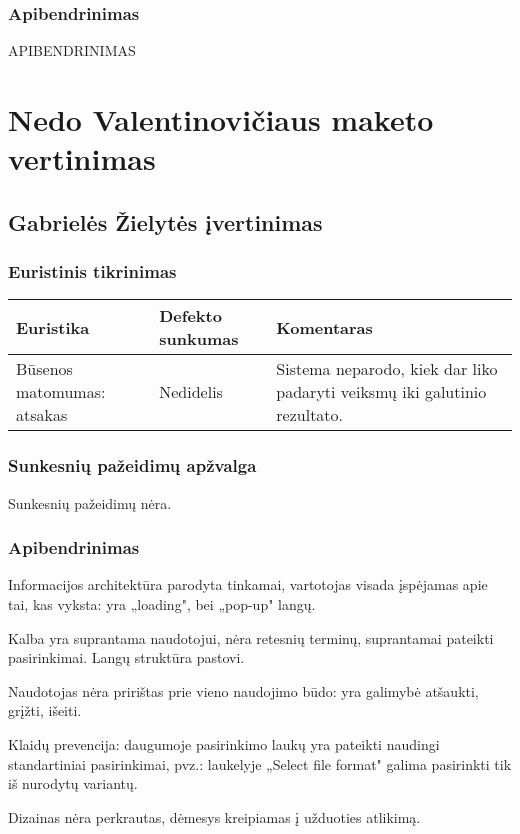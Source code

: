 \documentclass{VUMIFPSkursinis}
\begin{document}
\subsubsection{Apibendrinimas}
APIBENDRINIMAS

\section{Nedo Valentinovičiaus maketo vertinimas}
\subsection{Gabrielės Žielytės įvertinimas}
\subsubsection{Euristinis tikrinimas}
\begin{center}
 \begin{tabular}{|| p{4cm} | p{4cm} | p{8cm} ||} 
 \hline
 Euristika & Defekto sunkumas & Komentaras \\
 \hline\hline
 Būsenos matomumas: atsakas & Nedidelis & Sistema neparodo, kiek dar liko padaryti veiksmų iki galutinio rezultato.\\ 
 \hline
\end{tabular}	
\end{center}

\subsubsection{Sunkesnių pažeidimų apžvalga}
Sunkesnių pažeidimų nėra.

\subsubsection{Apibendrinimas}
Informacijos architektūra parodyta tinkamai, vartotojas visada įspėjamas apie tai, kas vyksta: yra „loading", bei „pop-up" langų.

Kalba yra suprantama naudotojui, nėra retesnių terminų, suprantamai pateikti pasirinkimai. Langų struktūra pastovi.

Naudotojas nėra pririštas prie vieno naudojimo būdo: yra galimybė atšaukti, grįžti, išeiti.

Klaidų prevencija: daugumoje pasirinkimo laukų yra pateikti naudingi standartiniai pasirinkimai, pvz.: laukelyje „Select file format" galima pasirinkti tik iš nurodytų variantų.

Dizainas nėra perkrautas, dėmesys kreipiamas į užduoties atlikimą.
\end{document}
